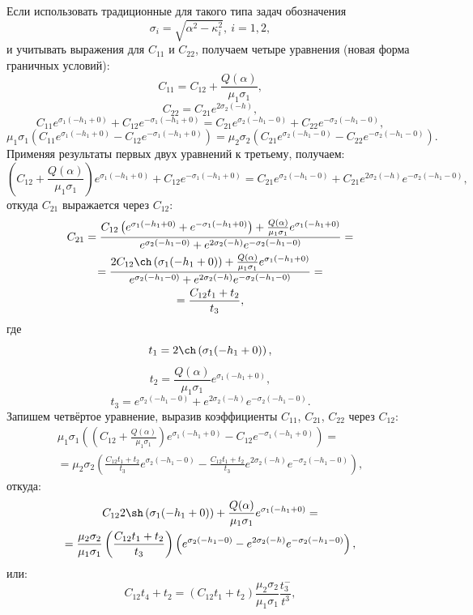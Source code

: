 \documentclass[a4paper, 12pt]{article}
\newcommand{\s}[1]{\sigma_{#1}}
\newcommand{\m}[1]{\mu_{#1}}
\newcommand{\E}[2]{e^{#1 #2}}
\begin{document}
Если использовать традиционные для такого типа задач обозначения
$$\sigma_i=\sqrt{\alpha^2-\kappa_i^2},\ i=1, 2,$$
и учитывать выражения для $C_{11}$ и $C_{22}$, получаем четыре уравнения (новая форма граничных условий):
$$C_{11}=C_{12}+\frac{Q(\alpha)}{\m{1} \s{1}},$$
$$C_{22}=C_{21} \E{2\s{2}}{(-h)},$$
$$C_{11} \E{\s{1}}{(-h_1+0)}+ C_{12} \E{-\s{1}}{(-h_1+0)}=C_{21} \E{\s{2}}{(-h_1-0)}+ C_{22} \E{-\s{2}}{(-h_1-0)},$$
$$\m{1}\s{1}\left(C_{11} \E{\s{1}}{(-h_1+0)}- C_{12} \E{-\s{1}}{(-h_1+0)}\right)=\m{2}\s{2}\left(C_{21} \E{\s{2}}{(-h_1-0)}- C_{22} \E{-\s{2}}{(-h_1-0)}\right).$$
Применяя результаты первых двух уравнений к третьему, получаем:
$$\left(C_{12}+\frac{Q(\alpha)}{\m{1} \s{1}} \right) \E{\s{1}}{(-h_1+0)}+ C_{12} \E{-\s{1}}{(-h_1+0)}=C_{21} \E{\s{2}}{(-h_1-0)}+ C_{21} \E{2\s{2}}{(-h)} \E{-\s{2}}{(-h_1-0)},$$
откуда $C_{21}$ выражается через $C_{12}$:
\begin{multline}
C_{21}=\frac{C_{12} \left(\E{\s{1}}{(-h_1+0)}+\E{-\s{1}}{(-h_1+0)}\right)+\frac{Q(\alpha)}{\m{1} \s{1}} \E{\s{1}}{(-h_1+0)}}{\E{\s{2}}{(-h_1-0)}+ \E{2\s{2}}{(-h)} \E{-\s{2}}{(-h_1-0)}}= \\
=\frac{2 C_{12} \ch \left(\s{1} (-h_1+0)\right)+\frac{Q(\alpha)}{\m{1} \s{1}} \E{\s{1}}{(-h_1+0)}}{\E{\s{2}}{(-h_1-0)}+ \E{2\s{2}}{(-h)} \E{-\s{2}}{(-h_1-0)}} =\\
=\frac{C_{12}t_1+t_2}{t_3},
\end{multline}
где
$$t_1=2\ch \left(\s{1} (-h_1+0) \right),$$
$$t_2=\frac{Q(\alpha)}{\m{1} \s{1}} \E{\s{1}}{(-h_1+0)},$$
$$t_3=\E{\s{2}}{(-h_1-0)}+ \E{2\s{2}}{(-h)} \E{-\s{2}}{(-h_1-0)} .$$
Запишем четвёртое уравнение, выразив коэффициенты $C_{11}$, $C_{21}$, $C_{22}$ через $C_{12}$:
\begin{multline}
\m{1}\s{1}\left(\left(C_{12}+\frac{Q(\alpha)}{\m{1} \s{1}}\right) \E{\s{1}}{(-h_1+0)}- C_{12} \E{-\s{1}}{(-h_1+0)}\right)= \\
=\m{2}\s{2}\left(\frac{C_{12}t_1+t_2}{t_3} \E{\s{2}}{(-h_1-0)}- \frac{C_{12}t_1+t_2}{t_3}\E{2\s{2}}{(-h)} \E{-\s{2}}{(-h_1-0)} \right),    
\end{multline}
откуда:
\begin{multline}
C_{12} 2 \sh \left(\s{1} (-h_1+0)\right)+ \frac{Q(\alpha)}{\m{1} \s{1}}\E{\s{1}}{(-h_1+0)}=\\
=\frac{\m{2}\s{2}}{\m{1}\s{1}} \left(\frac{C_{12}t_1+t_2}{t_3}\right)\left(\E{\s{2}}{(-h_1-0)}- \E{2\s{2}}{(-h)} \E{-\s{2}}{(-h_1-0)}\right),
\end{multline}
или:
$$C_{12} t_4+t_2=(C_{12} t_1 + t_2)\frac{\m{2}\s{2}}{\m{1}\s{1}} \frac{t_3^-}{t^3},$$
\end{document}
